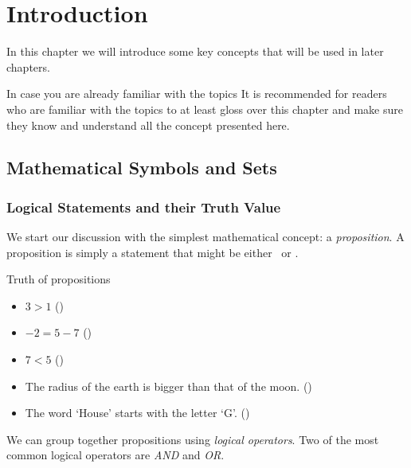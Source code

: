 
\chapter{Introduction}
In this chapter we will introduce some key concepts that will be used in later chapters.

\begin{note}{In case you are already familiar with the topics}{}
	It is recommended for readers who are familiar with the topics to at least gloss over this chapter and make sure they know and understand all the concept presented here.
\end{note}

\section{Mathematical Symbols and Sets}
\subsection{Logical Statements and their Truth Value}
We start our discussion with the simplest mathematical concept: a \emph{proposition}. A proposition is simply a statement that might be either \true\ or \false.
\begin{example}{Truth of propositions}{}
	\begin{itemize}
		\item $3>1$ (\true)
		\item $-2=5-7$ (\true)
		\item $7<5$ (\false)
		\item The radius of the earth is bigger than that of the moon. (\true)
		\item The word `House' starts with the letter `G'. (\false)
	\end{itemize}
\end{example}

We can group together propositions using \emph{logical operators}. Two of the most common logical operators are \emph{AND} and \emph{OR}.

